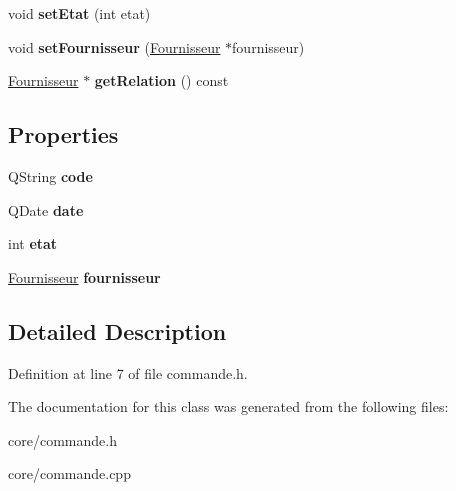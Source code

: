 \begin{DoxyCompactItemize}
\item 
\hypertarget{class_commande_ab6f80b3c1977fff775a8e56bc7dc700f}{
void {\bfseries setEtat} (int etat)}
\label{da/de7/class_commande_ab6f80b3c1977fff775a8e56bc7dc700f}

\item 
\hypertarget{class_commande_a215f27c225512c97b273102a04692493}{
void {\bfseries setFournisseur} (\hyperlink{class_fournisseur}{Fournisseur} $\ast$fournisseur)}
\label{da/de7/class_commande_a215f27c225512c97b273102a04692493}

\item 
\hypertarget{class_commande_a1a3e9d88a79e02a7e147a142d0775b06}{
\hyperlink{class_fournisseur}{Fournisseur} $\ast$ {\bfseries getRelation} () const }
\label{da/de7/class_commande_a1a3e9d88a79e02a7e147a142d0775b06}

\end{DoxyCompactItemize}
\subsection*{Properties}
\begin{DoxyCompactItemize}
\item 
\hypertarget{class_commande_a2ecb8ace957493fa223e1e768e85bda7}{
QString {\bfseries code}}
\label{da/de7/class_commande_a2ecb8ace957493fa223e1e768e85bda7}

\item 
\hypertarget{class_commande_a15b8137e1c75757be341481e8668449f}{
QDate {\bfseries date}}
\label{da/de7/class_commande_a15b8137e1c75757be341481e8668449f}

\item 
\hypertarget{class_commande_a5794dadb5575bae3350d8cfd60b17400}{
int {\bfseries etat}}
\label{da/de7/class_commande_a5794dadb5575bae3350d8cfd60b17400}

\item 
\hypertarget{class_commande_a4d64d1201bc40fb954d208384388b21e}{
\hyperlink{class_fournisseur}{Fournisseur} {\bfseries fournisseur}}
\label{da/de7/class_commande_a4d64d1201bc40fb954d208384388b21e}

\end{DoxyCompactItemize}


\subsection{Detailed Description}


Definition at line 7 of file commande.h.



The documentation for this class was generated from the following files:\begin{DoxyCompactItemize}
\item 
core/commande.h\item 
core/commande.cpp\end{DoxyCompactItemize}
